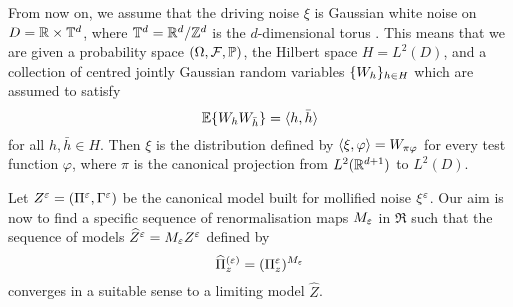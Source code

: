 \documentclass[reqno,11pt]{article}
\begin{document}
From now on, we assume that the driving noise $\xi$ is Gaussian white noise on
$D=\mathbb{R}\times\mathbb{T}^d$, where $\mathbb{T}^d=\mathbb{R}^d/\mathbb{Z}^d$ is the $d$-dimensional torus .
This means that we are given a probability space $(\Omega,{\mathcal F},\mathbb{P})$, the Hilbert
space $H=L^2(D)$, and a collection of centred jointly Gaussian random
variables $\{W_h\}_{h\in H}$ which are assumed to satisfy 
\begin{equation}
 \label{eq:white_noise}
 \expec{W_hW_{\bar h}} = \pscal{h}{\bar h}
\end{equation} 
for all $h, \bar h\in H$. 
Then $\xi$ is the distribution defined by
$\langle\xi,\varphi\rangle=W_{\pi\varphi}$ for every test function $\varphi$, where
$\pi$ is the canonical projection from $L^2(\mathbb{R}^{d+1})$ to $L^2(D)$.

Let $Z^\varepsilon=(\Pi^\varepsilon,\Gamma^\varepsilon)$ be the canonical model built for mollified
noise $\xi^\varepsilon$. Our aim is now to find a specific sequence of renormalisation
maps $M_\varepsilon$ in $\mathfrak{R}$ such that the sequence of models $\widehat
Z^\varepsilon=M_\varepsilon Z^\varepsilon$ defined by 
\begin{equation}
 \label{eq:rFHN01}
 \widehat\Pi_z^{(\eps)} = (\Pi_z^\eps)^{M_\eps}
\end{equation} 
converges in a suitable sense to a limiting model $\widehat Z$. 
\end{document}
